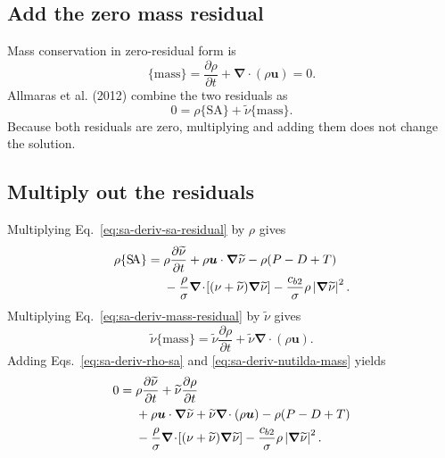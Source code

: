 \documentclass[11pt]{article}
\newcommand{\SAgrad}{\boldsymbol{\nabla}}
\newcommand{\SAdiv}{\boldsymbol{\nabla}\!\cdot}
\begin{document}
\subsection{Add the zero mass residual}

Mass conservation in zero-residual form is
\begin{equation}
  \{\mathrm{mass}\}
  =\frac{\partial\rho}{\partial t}
  +\SAdiv(\rho\boldsymbol u)
  =0.
  \label{eq:sa-deriv-mass-residual}
\end{equation}
Allmaras et al. (2012) combine the two residuals as
\begin{equation}
  0=\rho\{\mathrm{S\!A}\}
  +\widetilde{\nu}\{\mathrm{mass}\}.
  \label{eq:sa-deriv-combined-residuals}
\end{equation}
Because both residuals are zero, multiplying and adding them does not change
the solution.

\Needspace{0.38\textheight}
\subsection{Multiply out the residuals}

Multiplying Eq.~\eqref{eq:sa-deriv-sa-residual} by \(\rho\) gives
\begin{align}
  \rho\{\mathrm{S\!A}\}={}&
  \rho\frac{\partial\widetilde{\nu}}{\partial t}
  +\rho\boldsymbol u\mathbin{\cdot}\SAgrad\widetilde{\nu}
  -\rho(P-D+T) \notag\\
  &-\frac{\rho}{\sigma}
   \SAdiv\!\left[(\nu+\widetilde{\nu})\SAgrad\widetilde{\nu}\right]
  -\frac{c_{b2}}{\sigma}\rho
   \left|\SAgrad\widetilde{\nu}\right|^2.
  \label{eq:sa-deriv-rho-sa}
\end{align}
Multiplying Eq.~\eqref{eq:sa-deriv-mass-residual} by
\(\widetilde{\nu}\) gives
\begin{equation}
  \widetilde{\nu}\{\mathrm{mass}\}
  =\widetilde{\nu}\frac{\partial\rho}{\partial t}
  +\widetilde{\nu}\SAdiv(\rho\boldsymbol u).
  \label{eq:sa-deriv-nutilda-mass}
\end{equation}
Adding Eqs.~\eqref{eq:sa-deriv-rho-sa} and
\eqref{eq:sa-deriv-nutilda-mass} yields
\begin{align}
  0={}&
  \rho\frac{\partial\widetilde{\nu}}{\partial t}
  +\widetilde{\nu}\frac{\partial\rho}{\partial t} \notag\\
  &+\rho\boldsymbol u\mathbin{\cdot}\SAgrad\widetilde{\nu}
  +\widetilde{\nu}\SAdiv(\rho\boldsymbol u)
  -\rho(P-D+T) \notag\\
  &-\frac{\rho}{\sigma}
   \SAdiv\!\left[(\nu+\widetilde{\nu})\SAgrad\widetilde{\nu}\right]
  -\frac{c_{b2}}{\sigma}\rho
   \left|\SAgrad\widetilde{\nu}\right|^2.
  \label{eq:sa-deriv-expanded-sum}
\end{align}
\end{document}

